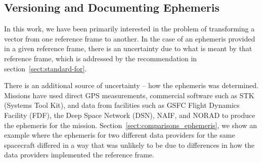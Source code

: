 \documentclass[draft]{agujournal2019}
\begin{document}












\subsection{Versioning and Documenting Ephemeris}
\label{sect:ephemeris-version}

In this work, we have been primarily interested in the problem of transforming a vector from one reference frame to another. In the case of an ephemeris provided in a given reference frame, there is an uncertainty due to what is meant by that reference frame, which is addressed by the recommendation in section~\ref{sect:standard-for}.

There is an additional source of uncertainty -- how the ephemeris was determined. Missions have used direct GPS measurements, commercial software such as STK (Systems Tool Kit), and data from facilities such as GSFC Flight Dynamics Facility (FDF), the Deep Space Network (DSN), NAIF, and NORAD to produce the ephemeris for the mission.  Section~\ref{sect:comparisons_ephemeris}, we show an example where the ephemeris for two different data providers for the same spacecraft differed in a way that was unlikely to be due to differences in how the data providers implemented the reference frame. 
\end{document}
